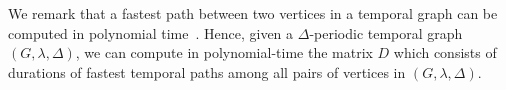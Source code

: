 \documentclass[a4paper,UKenglish,cleveref, autoref, thm-restate,anonymous]{lipics-v2021}
\newcommand{\ie}{i.\,e.,\ }
\newcommand{\kDeltaExact}{\textsc{$(k,\Delta)$-TGR}}
\begin{document}
We remark that a fastest path between two vertices in a temporal graph can be computed in polynomial time~\cite{xuan_computing_2003,Wu2016Efficient}.
Hence, given a $\Delta$-periodic temporal graph $(G,\lambda,\Delta)$, we can compute in polynomial-time  the matrix $D$
which consists of durations of fastest temporal paths among all pairs of vertices in $(G,\lambda,\Delta)$.

\begin{comment}
Let $(G,\lambda)$ be a temporal graph with  $n = |V(G)|$ and  $m=|E(G)|$.
Let $v \in V(G)$ be an arbitrary vertex of $G$, denote with $deg_{max}$ the maximum degree of all vertices in $V(G)$ and let $S_v$ be the set of time edges in $(G,\lambda)$, incident to $v$, \ie $S_v = \{(uv, \lambda(uv)) | uv \in E(G)\}$.
In their work Wu et~al.~\cite{Wu2016Efficient} provide an algorithm that computes the duration of the fastest temporal path from a source vertex $v$ to all other vertices in $G$ in
$O(n + m \log c)$ time, where $c = \min \{|S_v|, deg_{max}\}$.
From this result, we can deduce the following. 
\begin{lemma} \label{lemma:calculatingD}
Let $(G, \lambda, \Delta)$ be a $\Delta$-periodic temporal graph, where $\lambda$ assigns exactly $k$ labels to every edge of $G$. 
Denote with $deg_{max}$ the maximum degree of vertices in $G$, let $deg(v_i)$ be the degree of vertex $v_i \in V(G)$,
and let $c_{v_i} = \min \{ k \cdot deg(v_i), deg_{max}\}$.\\
To calculate the durations of all fastest temporal paths from a fixed vertex $v \in V(G)$ to all other vertices, it takes $O(n + m \log c_v)$ time. \\
To calculate the durations of the fastest temporal paths among all pairs of vertices we then need $O(n^2 + m \sum_{v \in V(G)} \log c_v)$ time.
\end{lemma}

Observe that $O(n + m \log c_v) = O(n + m \log deg_{max}) = O(n + m \log n) = O(n^2 \log n)$ and similarly
$O(n^2 + m \sum_{v \in V(G)} \log c_v) = O(n^2 + mn \log deg_{max}) = O(n + mn \log n) = O(n^3 \log n)$.
Since an instance $I$ of \kDeltaExact\ problem is an $n \times n$ matrix $D$, the running time of calculating one row of $D$ (\ie the fastest temporal paths from a single vertex to all others) takes $O(|I|\log \sqrt{|I|})$-time and calculating the whole matrix $D$ (\ie the fastest temporal paths among all pairs of vertices) takes $O(|I|^{3/2} \log \sqrt{|I|})$ time.
Therefore, from now on we say that calculating (a row of) $D$ takes polynomial time.
\end{comment}
\end{document}
